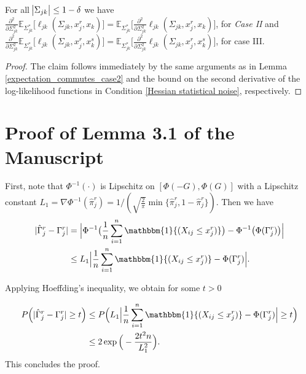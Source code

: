 \begin{corollary}\label{expectation_commutes_case3}
    For all $\abs{\Sigma_{jk}} \leq 1-\delta$ we have \\
    $\frac{\partial^2 }{\partial \Sigma_{jk}^2} \mathbb{E}_{\Sigma_{jk}^*} \big[\ell_{jk}(\Sigma_{jk}, x^r_j,x_k)\big] = \mathbb{E}_{\Sigma_{jk}^*} \Bigg[\frac{\partial^2 }{\partial \Sigma_{jk}^2} \ell_{jk}(\Sigma_{jk}, x^r_j,x_k) \Bigg]$, for \textit{Case II} and \\
    $\frac{\partial^2 }{\partial \Sigma_{jk}^2} \mathbb{E}_{\Sigma_{jk}^*} \big[\ell_{jk}(\Sigma_{jk}, x_j^r,x_k^s)\big] = \mathbb{E}_{\Sigma_{jk}^*} \Bigg[\frac{\partial^2 }{\partial \Sigma_{jk}^2} \ell_{jk}(\Sigma_{jk}, x_j^r,x_k^s) \Bigg]$, for case III.

    \begin{proof}
        The claim follows immediately by the same arguments as in Lemma \ref{expectation_commutes_case2} and the bound on the second derivative of the log-likelihood functions in Condition \ref{Hessian statistical noise}, respectively.
    \end{proof}
\end{corollary}

\section{Proof of Lemma 3.1 of the Manuscript %
 }\label{lemma_threshold_proof}

First, note that $\Phi^{-1}(\cdot)$ is Lipschitz on $[\Phi(-G),\Phi(G)]$ with a Lipschitz constant \(L_1 = \nabla \Phi^{-1}(\hat\pi_j^r) =  1/(\sqrt{\frac{2}{\pi}} \min\{\hat\pi^r_j, 1- \hat\pi^r_j\})\). Then we have
\begin{align*}
    \Abs{\hat{\Gamma}^r_j - \Gamma^r_j} & = \Abs[\Big]{\Phi^{-1}\big(\frac{1}{n} \sum_{i=1}^n \mathbbm{1}{(X_{ij} \leq x^r_j)}\big) - \Phi^{-1}\big(\Phi(\Gamma^r_j)\big)} \\
                                        & \leq L_1\Abs[\Big]{\frac{1}{n} \sum_{i=1}^n \mathbbm{1}{(X_{ij} \leq x^r_j)} - \Phi(\Gamma^r_j)}.
\end{align*}

Applying Hoeffding's inequality, we obtain for some $t > 0$

\begin{align*}
    P\Big(\Abs{\hat\Gamma_j^r - \Gamma_j^r} \geq t \Big) & \leq P\Big(L_1\Abs[\Big]{\frac{1}{n} \sum_{i=1}^n \mathbbm{1}{(X_{ij} \leq x^r_j)} - \Phi(\Gamma^r_j)} \geq t  \Big) \\
                                                         & \leq 2\exp{\Big(- \frac{2t^2n}{L_1^2}\Big)}.
\end{align*}
This concludes the proof.

